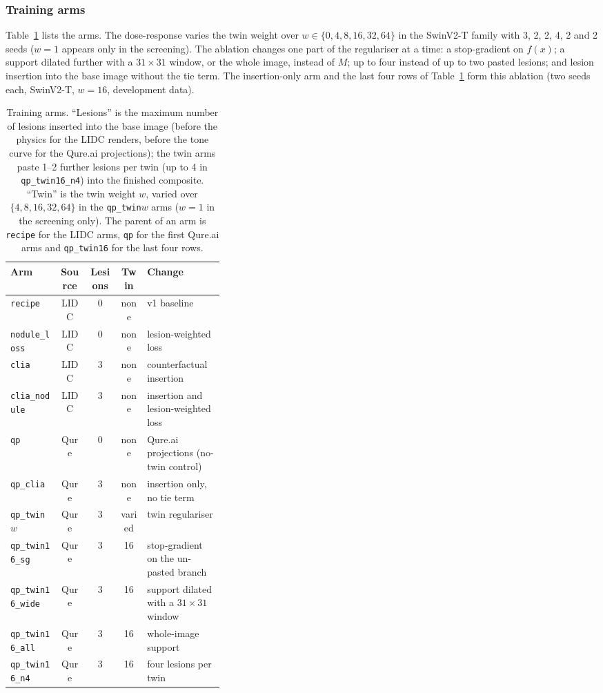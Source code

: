 \subsubsection{Training arms}
Table~\ref{tab:arms} lists the arms. The dose-response varies the twin weight over $w\in\{0,4,8,16,32,64\}$ in the SwinV2-T family with 3,
2, 2, 4, 2 and 2 seeds ($w=1$ appears only in the screening). The ablation changes one part of the regulariser at a time: a stop-gradient
on $f(x)$; a support dilated further with a $31\times31$ window, or the whole image, instead of $M$; up to four instead of up to two pasted
lesions; and lesion insertion into the base image without the tie term. The insertion-only arm and the last four rows of
Table~\ref{tab:arms} form this ablation (two seeds each, SwinV2-T, $w=16$, development data).

\begin{table}[!t]
\centering
\caption{Training arms. ``Lesions'' is the maximum number of lesions inserted into the base image (before the physics for the LIDC
renders, before the tone curve for the Qure.ai projections); the twin arms paste 1--2 further lesions per twin (up to 4 in
\texttt{qp\_twin16\_n4}) into the finished composite. ``Twin'' is the twin weight $w$, varied over $\{4,8,16,32,64\}$ in the
\texttt{qp\_twin}$w$ arms ($w=1$ in the screening only). The parent of an arm is \texttt{recipe} for the LIDC arms, \texttt{qp} for the
first Qure.ai arms and \texttt{qp\_twin16} for the last four rows.}
\label{tab:arms}
\footnotesize
\setlength{\tabcolsep}{3pt}
\begin{tabular}{@{}lccc>{\raggedright\arraybackslash}p{0.36\linewidth}@{}}
\toprule
Arm & Source & Lesions & Twin & Change \\
\midrule
\texttt{recipe} & LIDC & 0 & none & v1 baseline \\
\texttt{nodule\_loss} & LIDC & 0 & none & lesion-weighted loss \\
\texttt{clia} & LIDC & 3 & none & counterfactual insertion \\
\texttt{clia\_nodule} & LIDC & 3 & none & insertion and lesion-weighted loss \\
\texttt{qp} & Qure & 0 & none & Qure.ai projections (no-twin control) \\
\texttt{qp\_clia} & Qure & 3 & none & insertion only, no tie term \\
\texttt{qp\_twin}$w$ & Qure & 3 & varied & twin regulariser \\
\texttt{qp\_twin16\_sg} & Qure & 3 & 16 & stop-gradient on the un-pasted branch \\
\texttt{qp\_twin16\_wide} & Qure & 3 & 16 & support dilated with a $31\times31$ window \\
\texttt{qp\_twin16\_all} & Qure & 3 & 16 & whole-image support \\
\texttt{qp\_twin16\_n4} & Qure & 3 & 16 & four lesions per twin \\
\bottomrule
\end{tabular}
\end{table}

